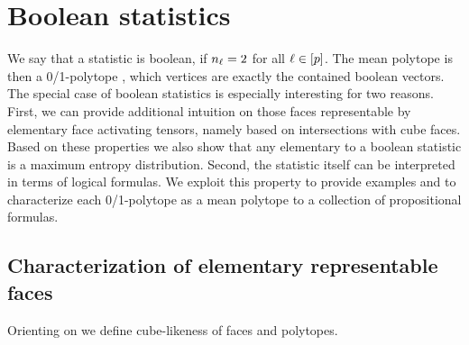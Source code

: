 \section{Boolean statistics}\label{sec:booleanStat}


We say that a statistic is boolean, if $n_{\ell}=2$ for all $\ell\in[p]$.
The mean polytope is then a 0/1-polytope \cite{ziegler_lectures_2000}, which vertices are exactly the contained boolean vectors.
The special case of boolean statistics is especially interesting for two reasons.
First, we can provide additional intuition on those faces representable by elementary face activating tensors, namely based on intersections with cube faces.
Based on these properties we also show that any elementary \ComputationActivationNetwork{} to a boolean statistic is a maximum entropy distribution.
Second, the statistic itself can be interpreted in terms of logical formulas.
We exploit this property to provide examples and to characterize each 0/1-polytope as a mean polytope to a collection of propositional formulas.



\subsection{Characterization of elementary representable faces}

Orienting on  we define cube-likeness of faces and polytopes.


